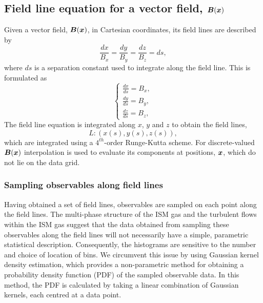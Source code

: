 \documentclass[useAMS,usenatbib]{mn2e}
\begin{document}
\subsection{Field line equation for a vector field, $\boldsymbol{B}(\boldsymbol{x})$}
Given a vector field, $\boldsymbol{B}(\boldsymbol{x})$, in Cartesian coordinates, its field lines are described by
\begin{equation}
\frac{dx}{B_{x}}=\frac{dy}{B_{y}}=\frac{dz}{B_{z}}=ds,
\label{f_lines_eqn}
\end{equation}
where $ds$ is a separation constant used to integrate along the field line. This is formulated as
\begin{equation}
\displaystyle
\begin{cases}
\frac{dx}{ds}=B_x,\\
\frac{dy}{ds}=B_y,\\
\frac{dz}{ds}=B_z,
\end{cases}
\label{fld_eqns}
\end{equation}
 The field line equation is integrated along $x$, $y$ and $z$ to obtain the field lines,
\[L: (x(s),y(s),z(s)),\]
which are integrated using a $4^{th}$-order Runge-Kutta scheme. For discrete-valued $\boldsymbol{B}(\boldsymbol{x})$ interpolation is used to evaluate its components at positions, $\boldsymbol{x}$, which do not lie on the data grid.
\subsubsection{Sampling observables along field lines}
Having obtained a set of field lines, observables are sampled on each point along the field lines. The multi-phase structure of the ISM gas and the turbulent flows within the ISM gas suggest that the data obtained from sampling these observables along the field lines will not necessarily have a simple, parametric statistical description. Consequently, the histograms are sensitive to the number and choice of location of bins. We circumvent this issue by using Gaussian kernel density estimation, which provides a non-parametric method for obtaining a probability density function (PDF) of the sampled observable data. In this method, the PDF is calculated by taking a linear combination of Gaussian kernels, each centred at a data point. 
\end{document}
